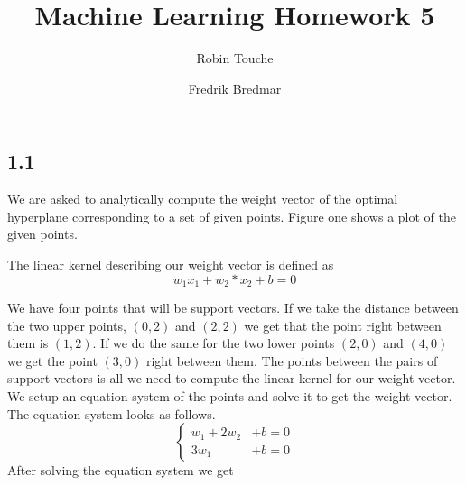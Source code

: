 \documentclass{article}
\author{
  Robin Touche \\
  \and
  Fredrik Bredmar
}
\title{Machine Learning Homework 5}
\begin{document}
\maketitle

\subsection*{1.1}
We are asked to analytically compute the weight vector of the optimal hyperplane corresponding to a set of given points.
Figure one shows a plot of the given points.

The linear kernel describing our weight vector is defined as
\[
w_1x_1 + w_2*x_2 + b = 0
\]

We have four points that will be support vectors.
If we take the distance between the two upper points, $(0,2)$ and $(2,2)$ we get that the point right between them is $(1,2)$.
If we do the same for the two lower points $(2,0)$ and $(4,0)$ we get the point $(3,0)$ right between them.
The points between the pairs of support vectors is all we need to compute the linear kernel for our weight vector. We setup an equation system of the points and solve it to get the weight vector.
The equation system looks as follows.
\[
\begin{cases}

  w_1  + 2w_2 &+ b = 0 \\
  3w_1 &+  b = 0

\end{cases}
\]
After solving the equation system we get
\end{document}
